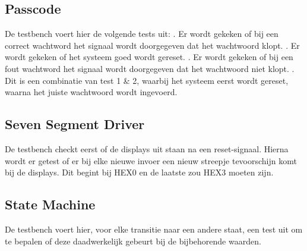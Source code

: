 \subsection{Passcode}
De testbench voert hier de volgende tests uit: . Er wordt gekeken of bij een correct wachtword het signaal wordt doorgegeven dat het wachtwoord klopt. . Er wordt gekeken of het systeem goed wordt gereset. . Er wordt gekeken of bij een fout wachtword het signaal wordt doorgegeven dat het wachtwoord niet klopt. . Dit is een combinatie van test 1 \& 2, waarbij het systeem eerst wordt gereset, waarna het juiste wachtwoord wordt ingevoerd. \newline


\subsection{Seven Segment Driver}
De testbench checkt eerst of de displays uit staan na een reset-signaal. Hierna wordt er getest of er bij elke nieuwe invoer een nieuw streepje tevoorschijn komt bij de displays. Dit begint bij HEX0 en de laatste zou HEX3 moeten zijn. \newline


\subsection{State Machine}
De testbench voert hier, voor elke transitie naar een andere staat, een test uit om te bepalen of deze daadwerkelijk gebeurt bij de bijbehorende waarden. \newline


